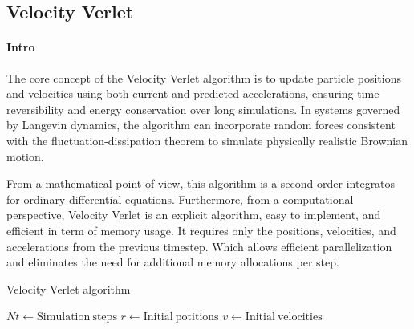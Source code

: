 \subsection{Velocity Verlet}

\paragraph{Intro} The core concept of the Velocity Verlet algorithm is to update particle positions and velocities using both current and predicted accelerations, ensuring time-reversibility and energy conservation over long simulations. 
In systems governed by Langevin dynamics, the algorithm can incorporate random forces consistent with the fluctuation-dissipation theorem to simulate physically realistic Brownian motion.

From a mathematical point of view, this algorithm is a second-order integratos for ordinary differential equations.
Furthermore, from a computational perspective, Velocity Verlet is an explicit algorithm, easy to implement, and efficient in term of memory usage.
It requires only the positions, velocities, and accelerations from the previous timestep.
Which allows efficient parallelization and eliminates the need for additional memory allocations per step.

\begin{algorithm}
\caption{Velocity Verlet algorithm}\label{alg:two}
$Nt \gets \mathrm{Simulation~steps}$\;
$r \gets \mathrm{Initial~potitions}$\;
$v \gets \mathrm{Initial~velocities}$\;
\end{algorithm}



